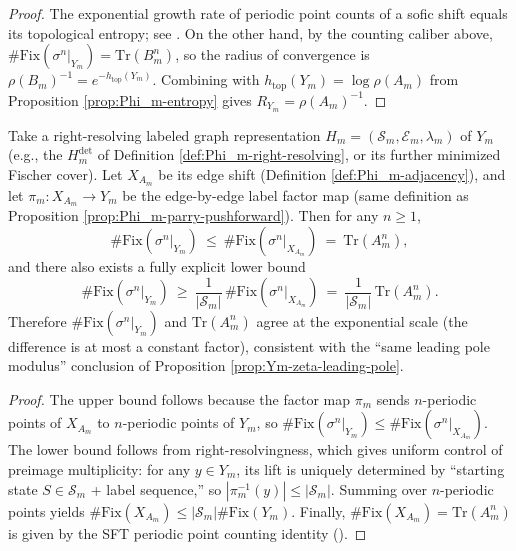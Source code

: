 \begin{proof}
The exponential growth rate of periodic point counts of a sofic shift equals its topological entropy; see \cite{Weiss1973SFTandSofic,CovenPaul1975SoficSystems,LindMarcus1995,Kitchens1998SymbolicDynamics}.
On the other hand, by the counting caliber above, \(\#\mathrm{Fix}(\sigma^n|_{Y_m})=\mathrm{Tr}(B_m^n)\), so the radius of convergence is \(\rho(B_m)^{-1}=e^{-h_{\mathrm{top}}(Y_m)}\). Combining with \(h_{\mathrm{top}}(Y_m)=\log\rho(A_m)\) from Proposition \ref{prop:Phi_m-entropy} gives \(R_{Y_m}=\rho(A_m)^{-1}\).
\end{proof}

\begin{proposition}[Explicit Sandwich for Periodic Point Counts: Cover \texorpdfstring{$\Rightarrow$}{=>} Sofic]\label{prop:periodic-count-sandwich}
Take a right-resolving labeled graph representation \(H_m=(\mathcal{S}_m,\mathcal{E}_m,\lambda_m)\) of \(Y_m\) (e.g., the \(H_m^{\mathrm{det}}\) of Definition \ref{def:Phi_m-right-resolving}, or its further minimized Fischer cover). Let \(X_{A_m}\) be its edge shift (Definition \ref{def:Phi_m-adjacency}), and let \(\pi_m:X_{A_m}\to Y_m\) be the edge-by-edge label factor map (same definition as Proposition \ref{prop:Phi_m-parry-pushforward}). Then for any \(n\ge 1\),
\[
\#\mathrm{Fix}(\sigma^n|_{Y_m})
\ \le\
\#\mathrm{Fix}(\sigma^n|_{X_{A_m}})
\ =\
\mathrm{Tr}(A_m^n),
\]
and there also exists a fully explicit lower bound
\[
\#\mathrm{Fix}(\sigma^n|_{Y_m})
\ \ge\
\frac{1}{|\mathcal{S}_m|}\,\#\mathrm{Fix}(\sigma^n|_{X_{A_m}})
\ =\
\frac{1}{|\mathcal{S}_m|}\,\mathrm{Tr}(A_m^n).
\]
Therefore \(\#\mathrm{Fix}(\sigma^n|_{Y_m})\) and \(\mathrm{Tr}(A_m^n)\) agree at the exponential scale (the difference is at most a constant factor), consistent with the ``same leading pole modulus'' conclusion of Proposition \ref{prop:Ym-zeta-leading-pole}.
\end{proposition}

\begin{proof}
The upper bound follows because the factor map \(\pi_m\) sends \(n\)-periodic points of \(X_{A_m}\) to \(n\)-periodic points of \(Y_m\), so \(\#\mathrm{Fix}(\sigma^n|_{Y_m})\le \#\mathrm{Fix}(\sigma^n|_{X_{A_m}})\).
The lower bound follows from right-resolvingness, which gives uniform control of preimage multiplicity: for any $y\in Y_m$, its lift is uniquely determined by ``starting state $S\in\mathcal{S}_m$ + label sequence,'' so $|\pi_m^{-1}(y)|\le |\mathcal{S}_m|$. Summing over $n$-periodic points yields
\(\#\mathrm{Fix}(X_{A_m})\le |\mathcal{S}_m|\#\mathrm{Fix}(Y_m)\).
Finally, \(\#\mathrm{Fix}(X_{A_m})=\mathrm{Tr}(A_m^n)\) is given by the SFT periodic point counting identity (\cite{LindMarcus1995}).
\end{proof}

